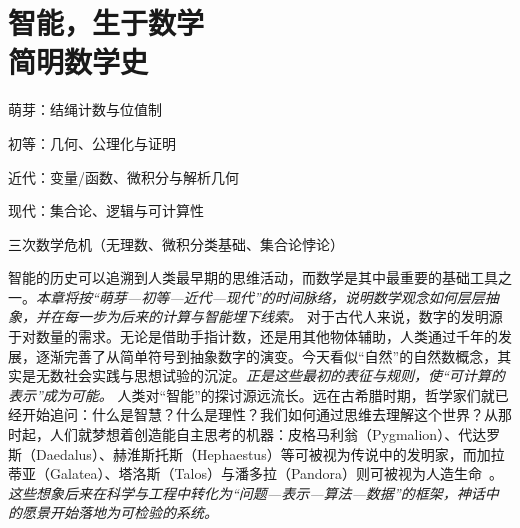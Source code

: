 \chapter{智能，生于数学 \texorpdfstring{\\}{ }简明数学史}
\newenvironment{examplebox}
{\par\vspace{0.5em}\noindent\hrulefill\par\noindent{示例盒子：三跳链}\par\small}
{\par\noindent\hrulefill\vspace{0.5em}\normalsize\par}
\begin{introduction}
\item 萌芽：结绳计数与位值制


\item 初等：几何、公理化与证明
\item 近代：变量/函数、微积分与解析几何
\item 现代：集合论、逻辑与可计算性
\item 三次数学危机（无理数、微积分类基础、集合论悖论）
\end{introduction}
智能的历史可以追溯到人类最早期的思维活动，而数学是其中最重要的基础工具之一。\emph{本章将按“萌芽—初等—近代—现代”的时间脉络，说明数学观念如何层层抽象，并在每一步为后来的计算与智能埋下线索。}
对于古代人来说，数字的发明源于对数量的需求。无论是借助手指计数，还是用其他物体辅助，人类通过千年的发展，逐渐完善了从简单符号到抽象数字的演变。今天看似“自然”的自然数概念，其实是无数社会实践与思想试验的沉淀。\emph{正是这些最初的表征与规则，使“可计算的表示”成为可能。}
人类对“智能”的探讨源远流长。远在古希腊时期，哲学家们就已经开始追问：什么是智慧？什么是理性？我们如何通过思维去理解这个世界？从那时起，人们就梦想着创造能自主思考的机器：皮格马利翁（Pygmalion）、代达罗斯（Daedalus）、赫淮斯托斯（Hephaestus）等可被视为传说中的发明家，而加拉蒂亚（Galatea）、塔洛斯（Talos）与潘多拉（Pandora）则可被视为人造生命~{\cite{OvidMartin2004,Sparkes1996,Tandy1997}}。 \emph{这些想象后来在科学与工程中转化为“问题—表示—算法—数据”的框架，神话中的愿景开始落地为可检验的系统。}

